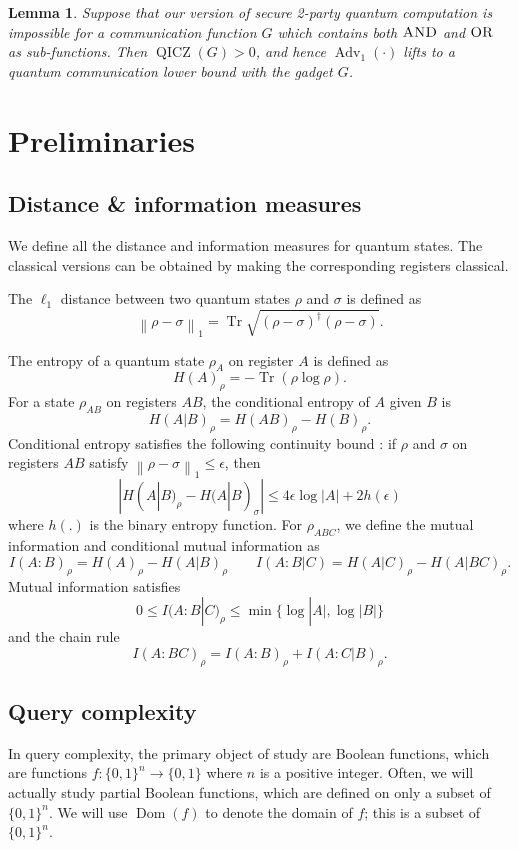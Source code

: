 \documentclass[10pt,a4paper]{article}
\newtheorem{lemma}[theorem]{Lemma}
\theoremstyle{definition}
\DeclareMathOperator{\Dom}{Dom}
\newcommand{\B}{\{0,1\}}
\renewcommand{\>}{\rangle}
\newcommand{\<}{\langle}
\DeclareMathOperator{\Tr}{Tr}
\newcommand{\norm}[1]{{\left\lVert#1\right\rVert}}
\newcommand{\OR}{\textsc{OR}}
\newcommand{\AND}{\textsc{AND}}
\DeclareMathOperator{\Adv}{Adv}
\DeclareMathOperator{\QICZ}{QICZ}
\begin{document}
\begin{lemma}
Suppose that our version of secure 2-party quantum computation
is impossible for a communication function $G$ which contains
both $\AND$ and $\OR$ as sub-functions. Then
$\QICZ(G)>0$, and hence $\Adv_1(\cdot)$ lifts to a
quantum communication lower bound with the gadget $G$.
\end{lemma}

\setcounter{section}{1}\setcounter{theorem}{8}\section{Preliminaries}
\subsection{Distance \& information measures}
We define all the distance and information measures for quantum states. The classical versions can be obtained by making the corresponding registers classical.

The $\ell_1$ distance between two quantum states $\rho$ and $\sigma$ is defined as
\[ \norm{\rho-\sigma}_1 = \Tr\sqrt{(\rho-\sigma)^\dagger(\rho-\sigma)}.\]

The entropy of a quantum state $\rho_A$ on register $A$ is defined as
\[H(A)_\rho = -\Tr(\rho\log\rho).\]
For a state $\rho_{AB}$ on registers $AB$, the conditional entropy of $A$ given $B$ is
\[ H(A|B)_\rho = H(AB)_\rho - H(B)_\rho.\]
Conditional entropy satisfies the following continuity bound \cite{AF04}: if $\rho$ and $\sigma$ on registers $AB$ satisfy $\norm{\rho-\sigma}_1 \leq \epsilon$, then
\[ |H(A|B)_\rho - H(A|B)_\sigma| \leq 4\epsilon\log|A| + 2h(\epsilon) \]
where $h(.)$ is the binary entropy function.
For $\rho_{ABC}$, we define the mutual information and conditional mutual information as
\[ I(A:B)_\rho = H(A)_\rho - H(A|B)_\rho \qquad I(A:B|C) = H(A|C)_\rho - H(A|BC)_\rho. \]
Mutual information satisfies
\[ 0 \leq I(A:B|C)_\rho \leq \min\{\log|A|,\log|B|\}\]
and the chain rule
\[ I(A:BC)_\rho = I(A:B)_\rho + I(A:C|B)_\rho.\]


\subsection{Query complexity}\label{sec:prelim_query}

In query complexity, the primary object of study
are Boolean functions, which are functions
$f\colon\B^n\to\B$ where $n$ is a positive integer. Often,
we will actually study partial Boolean functions, which
are defined on only a subset of $\B^n$. We will use
$\Dom(f)$ to denote the domain of $f$; this is a subset
of $\B^n$.
\end{document}
